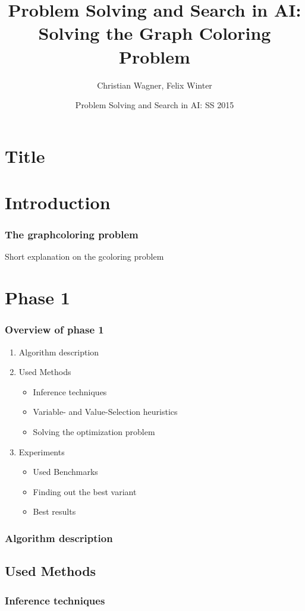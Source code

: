 \documentclass{beamer}
\title[Solving the Graph Coloring Problem] %
{Problem Solving and Search in AI: Solving the Graph Coloring
Problem}
\author{Christian Wagner, Felix Winter}
\institute
{
  TU Wien  
}
\date[SS 2015] %
{Problem Solving and Search in AI: SS 2015}
\begin{document}
\section{Title}
  \frame{\titlepage}


\section{Introduction}

\begin{frame}
  \frametitle{The graphcoloring problem}


  Short explanation on the gcoloring problem
  \end{frame}


\section{Phase 1}
  \begin{frame}
    \frametitle{Overview of phase 1}

    \begin{enumerate}
      \item Algorithm description
      \item Used Methods
        \begin{itemize}
        \item{Inference techniques}
        \item{Variable- and Value-Selection heuristics}
        \item{Solving the optimization problem}
        \end{itemize}
        
      \item{Experiments}
        \begin{itemize}
        \item{Used Benchmarks}
        \item{Finding out the best variant}
        \item{Best results}
        \end{itemize}

    \end{enumerate}
  \end{frame}


  \begin{frame}
    \frametitle{Algorithm description}


  \end{frame}
\subsection{Used Methods}
\begin{frame}
    \frametitle{Inference techniques}


  \end{frame}
\end{document}
